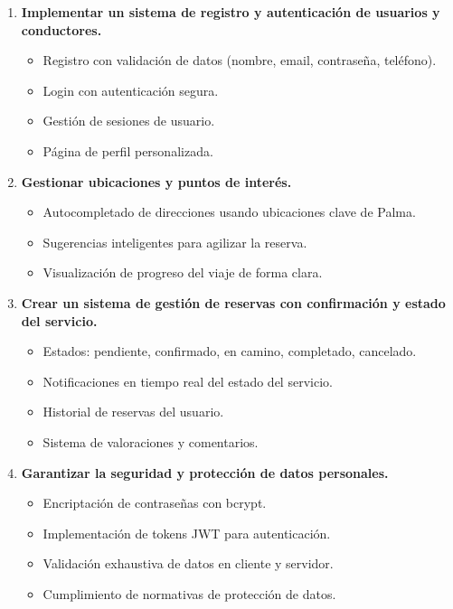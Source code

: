\documentclass[12pt,a4paper]{article}
\begin{document}
\begin{enumerate}
    \item \textbf{Implementar un sistema de registro y autenticación de usuarios y conductores.}
    \begin{itemize}
        \item Registro con validación de datos (nombre, email, contraseña, teléfono).
        \item Login con autenticación segura.
        \item Gestión de sesiones de usuario.
        \item Página de perfil personalizada.
    \end{itemize}
    
    \item \textbf{Gestionar ubicaciones y puntos de interés.}
    \begin{itemize}
        \item Autocompletado de direcciones usando ubicaciones clave de Palma.
        \item Sugerencias inteligentes para agilizar la reserva.
        \item Visualización de progreso del viaje de forma clara.
    \end{itemize}
    
    \item \textbf{Crear un sistema de gestión de reservas con confirmación y estado del servicio.}
    \begin{itemize}
        \item Estados: pendiente, confirmado, en camino, completado, cancelado.
        \item Notificaciones en tiempo real del estado del servicio.
        \item Historial de reservas del usuario.
        \item Sistema de valoraciones y comentarios.
    \end{itemize}
    
    \item \textbf{Garantizar la seguridad y protección de datos personales.}
    \begin{itemize}
        \item Encriptación de contraseñas con bcrypt.
        \item Implementación de tokens JWT para autenticación.
        \item Validación exhaustiva de datos en cliente y servidor.
        \item Cumplimiento de normativas de protección de datos.
    \end{itemize}
    

\end{enumerate}
\end{document}
